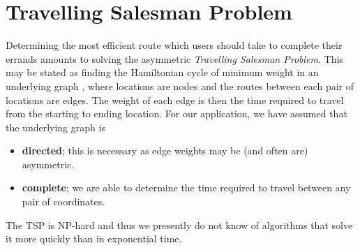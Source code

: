 \documentclass[a4paper, 10pt]{report}
\begin{document}
\section{Travelling Salesman Problem}
Determining the most efficient route which users should take to complete their errands amounts to solving the asymmetric \textit{Travelling Salesman Problem}. This may be stated as finding the Hamiltonian cycle of minimum weight in an underlying graph \cite{tsp-def}, where locations are nodes and the routes between each pair of locations are edges. The weight of each edge is then the time required to travel from the starting to ending location. For our application, we have assumed that the underlying graph is 
\begin{itemize}
\item \textbf{directed}; this is necessary as edge weights may be (and often are) asymmetric.
\item \textbf{complete}; we are able to determine the time required to travel between any pair of coordinates.
\end{itemize}
The TSP is NP-hard \cite{tsp-np-hard} and thus we presently do not know of algorithms that solve it more quickly than in exponential time.
\end{document}
